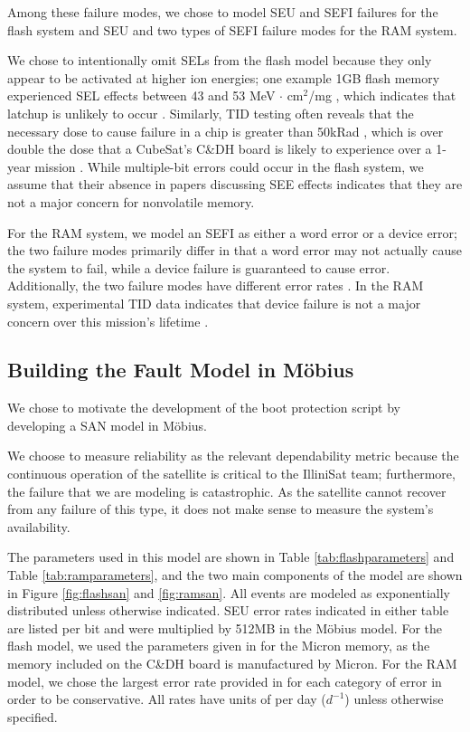 Among these failure modes, we chose to model SEU and SEFI failures for the flash system and SEU and two types of SEFI failure modes for the RAM system.  

We chose to intentionally omit SELs from the flash model because they only appear to be activated at higher ion energies; one example 1GB flash memory experienced SEL effects between 43 and 53 MeV $\cdot$ cm$^2$/mg \cite{Langley2004SEE}, which indicates that latchup is unlikely to occur \cite{Schwank2013Radiation}.  Similarly, TID testing often reveals that the necessary dose to cause failure in a chip is greater than 50kRad \cite{Oldham2008TID}, which is over double the dose that a CubeSat's C\&DH board is likely to experience over a 1-year mission \cite{Likar2010Novel}.  While multiple-bit errors could occur in the flash system, we assume that their absence in papers discussing SEE effects indicates that they are not a major concern for nonvolatile memory.  

For the RAM system, we model an SEFI as either a word error or a device error; the two failure modes primarily differ in that a word error may not actually cause the system to fail, while a device failure is guaranteed to cause error.  Additionally, the two failure modes have different error rates \cite{Gliem2012Memory}.  In the RAM system, experimental TID data indicates that device failure is not a major concern over this mission's lifetime \cite{Herrmann2013InSitu}.
 
\subsection{Building the Fault Model in M\"obius}\label{sec:buildingmodel}

We chose to motivate the development of the boot protection script by developing a SAN model in M\"obius.

We choose to measure reliability as the relevant dependability metric because the continuous operation of the satellite is critical to the IlliniSat team; furthermore, the failure that we are modeling is catastrophic.  As the satellite cannot recover from any failure of this type, it does not make sense to measure the system's availability.

The parameters used in this model are shown in Table \ref{tab:flashparameters} and Table \ref{tab:ramparameters}, and the two main components of the model are shown in Figure \ref{fig:flashsan} and \ref{fig:ramsan}.  All events are modeled as exponentially distributed unless otherwise indicated.  SEU error rates indicated in either table are listed per bit and were multiplied by 512MB in the M\"obius model.  For the flash model, we used the parameters given in \cite{Oldham2008TID} for the Micron memory, as the memory included on the C\&DH board is manufactured by Micron.  For the RAM model, we chose the largest error rate provided in \cite{Gliem2012Memory} for each category of error in order to be conservative.  All rates have units of per day ($d^{-1}$) unless otherwise specified.

